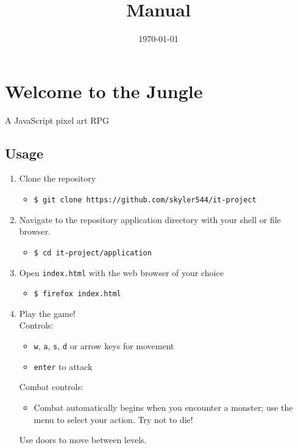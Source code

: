\documentclass[11pt]{article}
\date{\today}
\title{Manual}
\begin{document}
\maketitle


\section{Welcome to the Jungle}
\label{sec:orgf1c7914}
A JavaScript pixel art RPG\\
\subsection{Usage}
\label{sec:orgfd54fb8}
\begin{enumerate}
\item Clone the repository\\
\begin{itemize}
\item \texttt{\$ git clone https://github.com/skyler544/it-project}\\
\end{itemize}
\item Navigate to the repository application directory with your shell or file browser.\\
\begin{itemize}
\item \texttt{\$ cd it-project/application}\\
\end{itemize}
\item Open \texttt{index.html} with the web browser of your choice\\
\begin{itemize}
\item \texttt{\$ firefox index.html}\\
\end{itemize}
\item Play the game!\\
Controls:\\
\begin{itemize}
\item \texttt{w}, \texttt{a}, \texttt{s}, \texttt{d} or arrow keys for movement\\
\item \texttt{enter} to attack\\
\end{itemize}
Combat controls:\\
\begin{itemize}
\item Combat automatically begins when you encounter a monster; use the menu to select your action. Try not to die!\\
\end{itemize}
Use doors to move between levels.\\
\end{enumerate}
\end{document}

